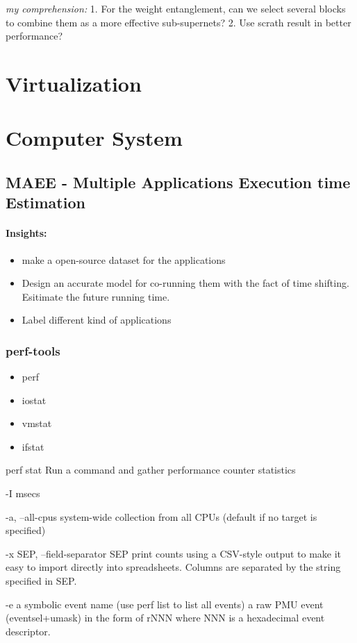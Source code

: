 \documentclass[UTF8]{article}
\begin{document}
\emph{my comprehension:} 1. For the weight entanglement, can we select several blocks to combine them as a more effective sub-supernets?  2. Use scrath result in better performance?

\section{Virtualization}
\section{Computer System}
\subsection{MAEE - Multiple Applications Execution time Estimation}
\paragraph{Insights:}
\begin{itemize}
	\item make a open-source dataset for the applications 
	\item Design an accurate model for co-running them with the fact of time shifting. Esitimate the future running time.
	\item Label different kind of applications
\end{itemize}

\subsubsection{perf-tools}
\begin{itemize}
	\item perf
	\item iostat
	\item vmstat
	\item ifstat
\end{itemize}

perf stat Run a command and gather performance counter statistics

-I msecs

-a, --all-cpus system-wide collection from all CPUs (default if no target is
specified)

-x SEP, --field-separator SEP
print counts using a CSV-style output to make it easy to import directly into spreadsheets. Columns are
separated by the string specified in SEP.


-e a symbolic event name (use perf list to list all events) a raw PMU event (eventsel+umask) in the form of rNNN where NNN
is a hexadecimal event descriptor.
\end{document}
